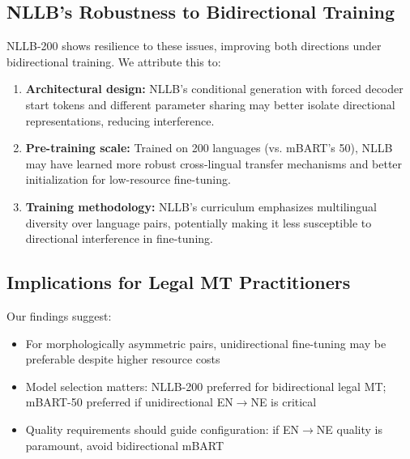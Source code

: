 \documentclass[manuscript, screen, review]{acmart}
\begin{document}

\subsection{NLLB's Robustness to Bidirectional Training}
\label{subsec:nllb_robustness}

NLLB-200 shows resilience to these issues, improving both directions under bidirectional training. We attribute this to:

\begin{enumerate}
\item \textbf{Architectural design:} NLLB's conditional generation with forced decoder start tokens and different parameter sharing may better isolate directional representations, reducing interference.

\item \textbf{Pre-training scale:} Trained on 200 languages (vs. mBART's 50), NLLB may have learned more robust cross-lingual transfer mechanisms and better initialization for low-resource fine-tuning.

\item \textbf{Training methodology:} NLLB's curriculum emphasizes multilingual diversity over language pairs, potentially making it less susceptible to directional interference in fine-tuning.
\end{enumerate}

\subsection{Implications for Legal MT Practitioners}
\label{subsec:implications}

Our findings suggest:

\begin{itemize}
\item For morphologically asymmetric pairs, unidirectional fine-tuning may be preferable despite higher resource costs

\item Model selection matters: NLLB-200 preferred for bidirectional legal MT; mBART-50 preferred if unidirectional EN$\rightarrow$NE is critical

\item Quality requirements should guide configuration: if EN$\rightarrow$NE quality is paramount, avoid bidirectional mBART
\end{itemize}
\end{document}

